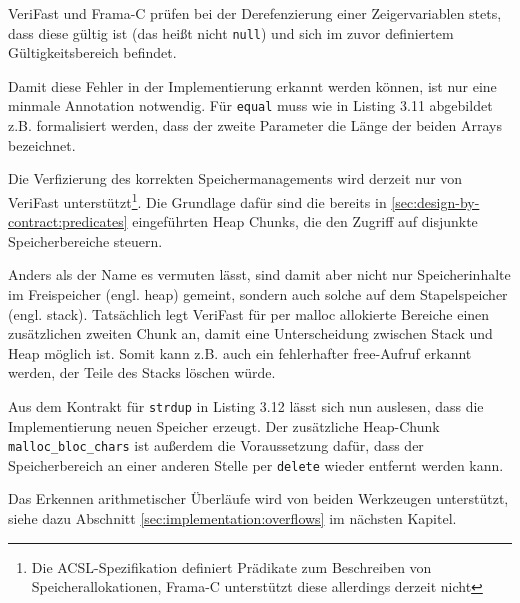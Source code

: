 VeriFast und Frama-C prüfen bei der Derefenzierung einer Zeigervariablen stets, dass diese gültig ist (das heißt
nicht \texttt{null}) und sich im zuvor definiertem Gültigkeitsbereich befindet. 

Damit diese Fehler in der Implementierung erkannt werden können, ist nur eine minmale Annotation notwendig. 
Für \texttt{equal} muss wie in Listing 3.11 abgebildet z.B. formalisiert werden, dass der zweite Parameter die 
Länge der beiden Arrays bezeichnet. 



Die Verfizierung des korrekten Speichermanagements wird derzeit nur von VeriFast unterstützt\footnote{Die ACSL-Spezifikation
definiert Prädikate zum Beschreiben von Speicherallokationen, Frama-C unterstützt diese allerdings derzeit nicht}. Die Grundlage dafür
sind die bereits in \ref{sec:design-by-contract:predicates} eingeführten Heap Chunks, die den Zugriff auf disjunkte 
Speicherbereiche steuern.

Anders als der Name es vermuten lässt, sind damit aber nicht nur Speicherinhalte im Freispeicher (engl. heap) gemeint, 
sondern auch solche auf dem Stapelspeicher (engl. stack). Tatsächlich legt VeriFast für
per malloc allokierte Bereiche einen zusätzlichen zweiten Chunk an, damit eine Unterscheidung zwischen Stack und
Heap möglich ist. Somit kann z.B. auch ein fehlerhafter free-Aufruf erkannt werden, der Teile des Stacks löschen würde.



Aus dem Kontrakt für \texttt{strdup} in Listing 3.12 lässt sich nun auslesen, dass die Implementierung neuen Speicher
erzeugt. Der zusätzliche Heap-Chunk \lstinline{malloc_bloc_chars} ist außerdem die Voraussetzung dafür, dass der Speicherbereich
an einer anderen Stelle per \texttt{delete} wieder entfernt werden kann.

Das Erkennen arithmetischer Überläufe wird von beiden Werkzeugen unterstützt, siehe dazu Abschnitt \ref{sec:implementation:overflows}
im nächsten Kapitel.



